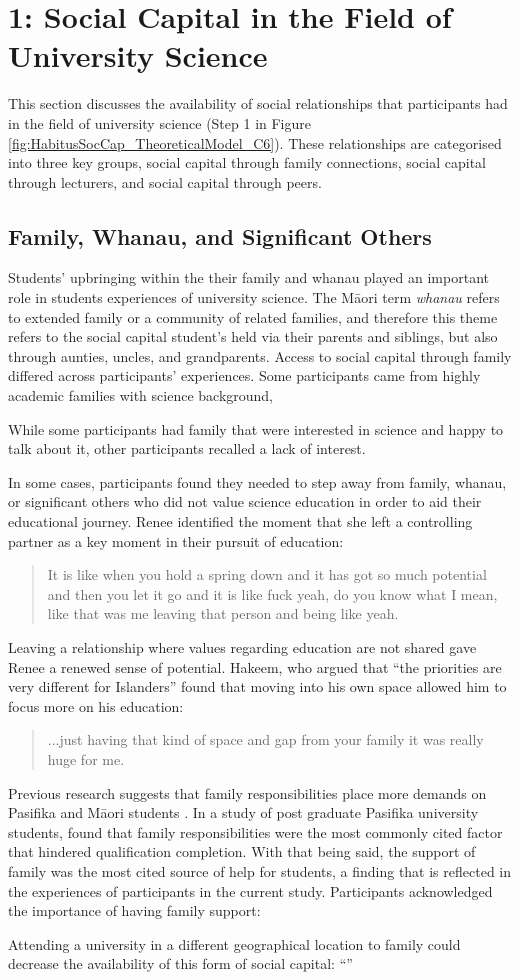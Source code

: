 \section{1: Social Capital in the Field of University Science}
This section discusses the availability of social relationships that participants had in the field of university science (Step 1 in Figure \ref{fig:HabitusSocCap_TheoreticalModel_C6}). These relationships are categorised into three key groups, social capital through family connections, social capital through lecturers, and social capital through peers. 

\subsection{Family, Whanau, and Significant Others}
Students' upbringing within the their family and whanau played an important role in students experiences of university science. The M\={a}ori term \textit{whanau} refers to extended family or a community of related families, and therefore this theme refers to the social capital student's held via their parents and siblings, but also through aunties, uncles, and grandparents. Access to social capital through family differed across participants' experiences. Some participants came from highly academic families with science background,

While some participants had family that were interested in science and happy to talk about it, other participants recalled a lack of interest. 

In some cases, participants found they needed to step away from family, whanau, or significant others who did not value science education in order to aid their educational journey. Renee identified the moment that she left a controlling partner as a key moment in their pursuit of education: \blockquote{It is like when you hold a spring down and it has got so much potential and then you let it go and it is like fuck yeah, do you know what I mean, like that was me leaving that person and being like yeah.}. Leaving a relationship where values regarding education are not shared gave Renee a renewed sense of potential. Hakeem, who argued that ``the priorities are very different for Islanders'' found that moving into his own space allowed him to focus more on his education: \blockquote{...just having that kind of space and gap from your family it was really huge for me.} Previous research suggests that family responsibilities place more demands on Pasifika and M\={a}ori students \citep{zepke2011non}. In a study of post graduate Pasifika university students, \cite{theodore2018pacific} found that family responsibilities were the most commonly cited factor that hindered qualification completion. With that being said, the support of family was the most cited source of help for students, a finding that is reflected in the experiences of participants in the current study. Participants acknowledged the importance of having family support: \blockquote{} Attending a university in a different geographical location to family could decrease the availability of this form of social capital: ``''


